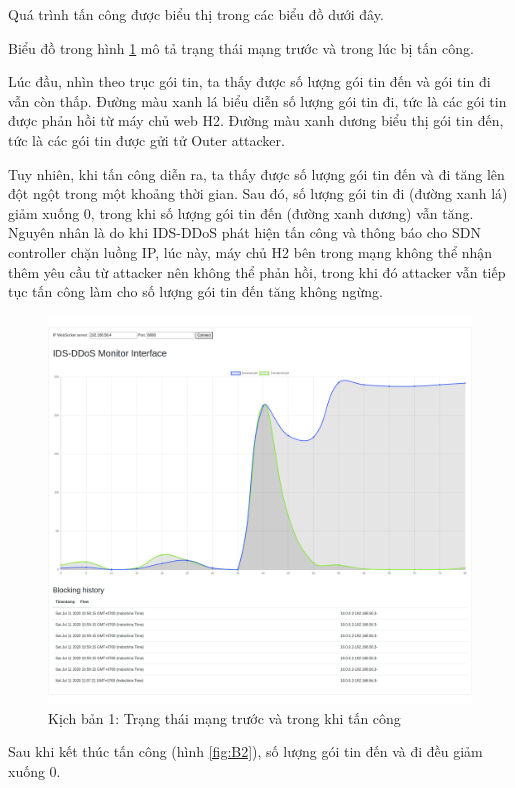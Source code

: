 Quá trình tấn công được biểu thị trong các biểu đồ dưới đây.

Biểu đồ trong hình \ref{fig:B1} mô tả trạng thái mạng trước và trong lúc bị tấn công. 

Lúc đầu, nhìn theo trục gói tin, ta thấy được số lượng gói tin đến và gói tin đi vẫn còn thấp. Đường màu xanh lá biểu diễn số lượng gói tin đi, tức là các gói tin được phản hồi từ máy chủ web H2. Đường màu xanh dương biểu thị gói tin đến, tức là các gói tin được gửi tử Outer attacker.

Tuy nhiên, khi tấn công diễn ra, ta thấy được số lượng gói tin đến và đi tăng lên đột ngột trong một khoảng thời gian. Sau đó, số lượng gói tin đi (đường xanh lá) giảm xuống 0, trong khi số lượng gói tin đến (đường xanh dương) vẫn tăng. Nguyên nhân là do khi IDS-DDoS phát hiện tấn công và thông báo cho SDN  controller chặn luồng IP, lúc này, máy chủ H2 bên trong mạng không thể nhận thêm yêu cầu từ attacker nên không thể phản hồi, trong khi đó attacker vẫn tiếp tục tấn công làm cho số lượng gói tin đến tăng không ngừng.

\begin{figure}[ht!]
	\centering
	\includegraphics[width=\linewidth]{fig/B1.png}
	\caption{Kịch bản 1: Trạng thái mạng trước và trong khi tấn công}
	\label{fig:B1}
\end{figure}

Sau khi kết thúc tấn công (hình \ref{fig:B2}), số lượng gói tin đến và đi đều giảm xuống 0.

